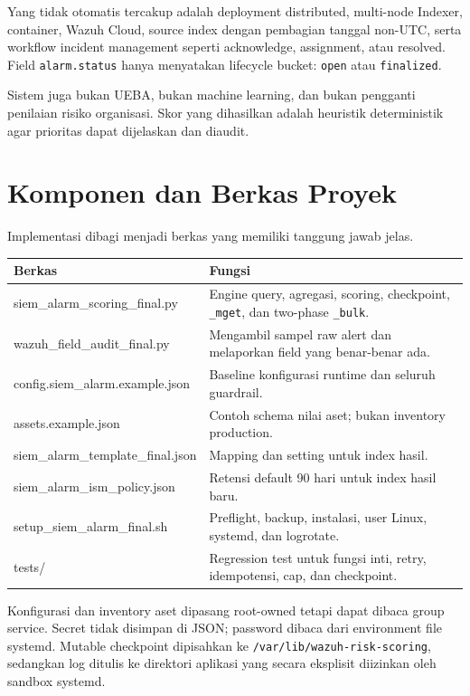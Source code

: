\documentclass[11pt,a4paper,oneside]{report}
\DeclareRobustCommand{\code}[1]{\nolinkurl{#1}}
\begin{document}
Yang tidak otomatis tercakup adalah deployment distributed, multi-node Indexer,
container, Wazuh Cloud, source index dengan pembagian tanggal non-UTC, serta
workflow incident management seperti acknowledge, assignment, atau resolved.
Field \code{alarm.status} hanya menyatakan lifecycle bucket: \code{open} atau
\code{finalized}.

Sistem juga bukan UEBA, bukan machine learning, dan bukan pengganti penilaian
risiko organisasi. Skor yang dihasilkan adalah heuristik deterministik agar prioritas
dapat dijelaskan dan diaudit.

\chapter{Komponen dan Berkas Proyek}

Implementasi dibagi menjadi berkas yang memiliki tanggung jawab jelas.

\begin{longtable}{>{\ttfamily\raggedright\arraybackslash}p{}p{}}
\toprule
\normalfont\textbf{Berkas} & \textbf{Fungsi}\\
\midrule
\endhead
siem\_alarm\_scoring\_final.py & Engine query, agregasi, scoring, checkpoint, \code{\_mget}, dan two-phase \code{\_bulk}.\\
wazuh\_field\_audit\_final.py & Mengambil sampel raw alert dan melaporkan field yang benar-benar ada.\\
config.siem\_alarm.example.json & Baseline konfigurasi runtime dan seluruh guardrail.\\
assets.example.json & Contoh schema nilai aset; bukan inventory production.\\
siem\_alarm\_template\_final.json & Mapping dan setting untuk index hasil.\\
siem\_alarm\_ism\_policy.json & Retensi default 90 hari untuk index hasil baru.\\
setup\_siem\_alarm\_final.sh & Preflight, backup, instalasi, user Linux, systemd, dan logrotate.\\
tests/ & Regression test untuk fungsi inti, retry, idempotensi, cap, dan checkpoint.\\
\bottomrule
\end{longtable}

Konfigurasi dan inventory aset dipasang root-owned tetapi dapat dibaca group service.
Secret tidak disimpan di JSON; password dibaca dari environment file systemd.
Mutable checkpoint dipisahkan ke \code{/var/lib/wazuh-risk-scoring}, sedangkan log
ditulis ke direktori aplikasi yang secara eksplisit diizinkan oleh sandbox systemd.
\end{document}

